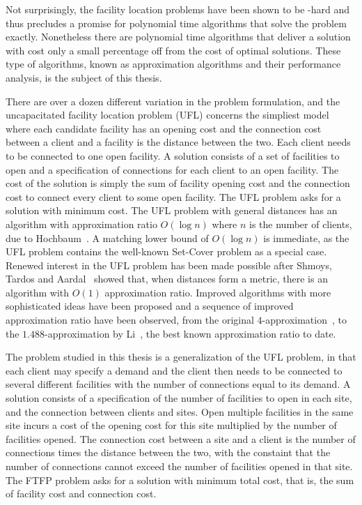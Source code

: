 \documentclass[oneside,final]{ucr}
\begin{document}
Not surprisingly, the facility location problems have been shown to be
\NP-hard and thus precludes a promise for polynomial time algorithms
that solve the problem exactly. Nonetheless there are polynomial time
algorithms that deliver a solution with cost only a small percentage
off from the cost of optimal solutions. These type of algorithms,
known as approximation algorithms and their performance analysis, is
the subject of this thesis.

There are over a dozen different variation in the problem formulation,
and the uncapacitated facility location problem (UFL) concerns the
simpliest model where each candidate facility has an opening cost and
the connection cost between a client and a facility is the distance
between the two. Each client needs to be connected to one open
facility. A solution consists of a set of facilities to open and a
specification of connections for each client to an open facility. The
cost of the solution is simply the sum of facility opening cost and
the connection cost to connect every client to some open facility. The
UFL problem asks for a solution with minimum cost. The UFL problem
with general distances has an algorithm with approximation ratio
$O(\log n)$ where $n$ is the number of clients, due to
Hochbaum~\cite{Hochbaum82}. A matching lower bound of $O(\log n)$ is
immediate, as the UFL problem contains the well-known Set-Cover
problem as a special case. Renewed interest in the UFL problem has
been made possible after Shmoys, Tardos and Aardal~\cite{ShmoysTA97}
showed that, when distances form a metric, there is an algorithm with
$O(1)$ approximation ratio. Improved algorithms with more
sophisticated ideas have been proposed and a sequence of improved
approximation ratio have been observed, from the original
$4$-approximation~\cite{ShmoysTA97}, to the $1.488$-approximation by
Li~\cite{Li11}, the best known approximation ratio to date.

The problem studied in this thesis is a generalization of the UFL
problem, in that each client may specify a demand and the client then
needs to be connected to several different facilities with the number
of connections equal to its demand.  A solution consists of a
specification of the number of facilities to open in each site, and
the connection between clients and sites. Open multiple facilities in
the same site incurs a cost of the opening cost for this site
multiplied by the number of facilities opened. The connection cost
between a site and a client is the number of connections times the
distance between the two, with the constaint that the number of
connections cannot exceed the number of facilities opened in that
site. The FTFP problem asks for a solution with minimum total cost,
that is, the sum of facility cost and connection cost.
\end{document}
